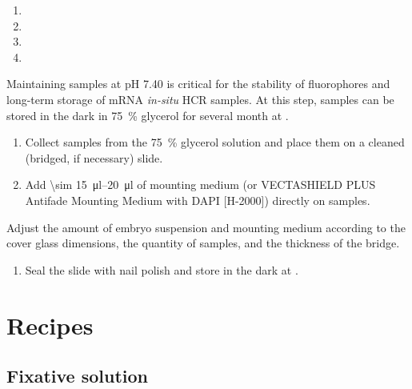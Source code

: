 \documentclass[10pt]{report}
\begin{document}
\begin{enumerate}[resume = steps]
	\item {}
	\item {}
	\item {}
	\item {}
\end{enumerate}

\bigskip\alert{Maintaining samples at pH 7.40 is critical for the stability of fluorophores and long-term storage of mRNA \textit{in-situ} HCR samples.}
\alert{At this step, samples can be stored in the dark in \qty{75}{\percent} glycerol for several month at \fourdegree.}

\begin{enumerate}[resume = steps]
	\item Collect samples from the \qty{75}{\percent} glycerol solution and place them on a cleaned (bridged, if necessary) slide.
	\item Add \qtyrange{\sim 15}{20}{\ul} of mounting medium (or VECTASHIELD\textregistered{} PLUS Antifade Mounting Medium with DAPI [H-2000]) directly on samples.
\end{enumerate}

\bigskip\alert{Adjust the amount of embryo suspension and mounting medium according to the cover glass dimensions, the quantity of samples, and the thickness of the bridge.}

\begin{enumerate}[resume = steps]
	\item	Seal the slide with nail polish and store in the dark at \fourdegree.
\end{enumerate}

\clearpage

\section*{\textendash{} Recipes \textendash{}}

\subsection*{Fixative solution}
\end{document}
